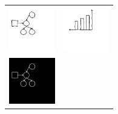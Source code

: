 \documentclass{article}
\newcommand{\exampleImageSize}{2cm}
\theoremstyle{definition}
\begin{document}
 \begin{figure}[H]%
  \begin{minipage}[b]{0.35\linewidth}  \centering
\begin{tabular}{ll}
  \includegraphics[width = \exampleImageSize]{figures/expert-60.png}&
    \includegraphics[width = \exampleImageSize]{figures/expert-58.png}\\
  \includegraphics[width = \exampleImageSize]{figures/60.png}&

\end{tabular}
\end{minipage}
\end{figure}
\end{document}
